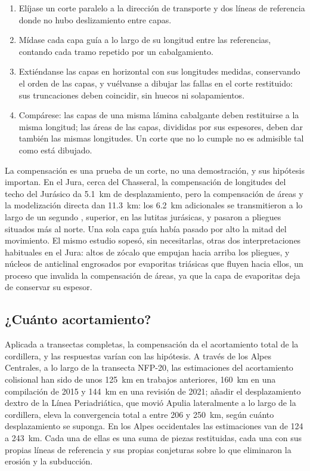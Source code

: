 \begin{method}\label{met:b2:alpine-orogen:restore}
\begin{enumerate}
\item Elíjase un corte paralelo a la dirección de transporte y dos líneas de referencia donde no
hubo deslizamiento entre capas.
\item Mídase cada capa guía a lo largo de su longitud entre las referencias, contando cada tramo
repetido por un cabalgamiento.
\item Extiéndanse las capas en horizontal con sus longitudes medidas, conservando el orden de las capas,
y vuélvanse a dibujar las fallas en el corte restituido: sus truncaciones deben coincidir, sin huecos
ni solapamientos.
\item Compárese: las capas de una misma lámina cabalgante deben restituirse a la misma longitud; las áreas de
las capas, divididas por sus espesores, deben dar también las mismas longitudes. Un corte que
no lo cumple no es admisible tal como está dibujado.
\end{enumerate}
\end{method}

La compensación es una prueba de un corte, no una demostración, y sus hipótesis importan. En el Jura,
cerca del Chasseral, la compensación de longitudes del techo del Jurásico da \qty{5.1}{km} de
desplazamiento, pero la compensación de áreas y la modelización directa dan \qty{11.3}{km}: los
\qty{6.2}{km} adicionales se transmitieron a lo largo de un segundo , superior, en las lutitas jurásicas, y pasaron
a pliegues situados más al norte. Una sola capa guía había pasado por alto la mitad del movimiento. El mismo estudio
sopesó, sin necesitarlas, otras dos interpretaciones habituales en el Jura: altos de zócalo que empujan
hacia arriba los pliegues, y núcleos de anticlinal engrosados por evaporitas triásicas que fluyen hacia ellos, un
proceso que invalida la compensación de áreas, ya que la capa de evaporitas deja de conservar su
espesor.

\subsection*{¿Cuánto acortamiento?}

Aplicada a transectas completas, la compensación da el acortamiento total de la cordillera, y las respuestas
varían con las hipótesis. A través de los Alpes Centrales, a lo largo de la transecta NFP-20, las estimaciones
del acortamiento colisional han sido de unos \qty{125}{km} en trabajos anteriores, \qty{160}{km} en
una compilación de 2015 y \qty{144}{km} en una revisión de 2021; añadir el desplazamiento dextro de la Línea Periadriática, que
movió Apulia lateralmente a lo largo de la cordillera, eleva la convergencia total a entre 206 y
\qty{250}{km}, según cuánto desplazamiento se suponga. En los Alpes occidentales las estimaciones
van de 124 a \qty{243}{km}. Cada una de ellas es una suma de piezas restituidas, cada una con
sus propias líneas de referencia y sus propias conjeturas sobre lo que eliminaron la erosión y la subducción.

